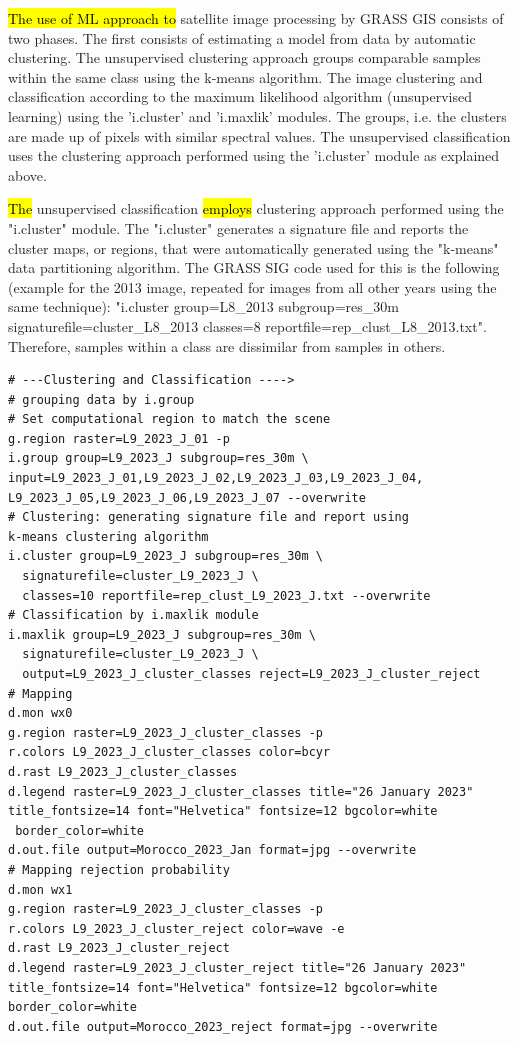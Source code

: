 \documentclass[geomatics,article,submit,pdftex,moreauthors]{Definitions/mdpi}
\begin{document}
\hl{The use of ML approach to} satellite image processing by GRASS GIS consists of two phases. The first consists of estimating a model from data by automatic clustering. The unsupervised clustering approach groups comparable samples within the same class using the k-means algorithm. The image clustering and classification according to the maximum likelihood algorithm (unsupervised learning) using the 'i.cluster' and 'i.maxlik' modules. The groups, i.e. the clusters are made up of pixels with similar spectral values. The unsupervised classification uses the clustering approach performed using the 'i.cluster' module as explained above.

\hl{The }unsupervised classification \hl{employs} clustering approach performed using the "i.cluster" module. The "i.cluster" generates a signature file and reports the cluster maps, or regions, that were automatically generated using the "k-means" data partitioning algorithm. The GRASS SIG code used for this is the following (example for the 2013 image, repeated for images from all other years using the same technique): "i.cluster group=L8\_2013 subgroup=res\_30m signaturefile=cluster\_L8\_2013 classes=8 reportfile=rep\_clust\_L8\_2013.txt". Therefore, samples within a class are dissimilar from samples in others.

\begin{footnotesize}
\begin{verbatim}
# ---Clustering and Classification ---->
# grouping data by i.group
# Set computational region to match the scene
g.region raster=L9_2023_J_01 -p
i.group group=L9_2023_J subgroup=res_30m \
input=L9_2023_J_01,L9_2023_J_02,L9_2023_J_03,L9_2023_J_04,
L9_2023_J_05,L9_2023_J_06,L9_2023_J_07 --overwrite
# Clustering: generating signature file and report using 
k-means clustering algorithm
i.cluster group=L9_2023_J subgroup=res_30m \
  signaturefile=cluster_L9_2023_J \
  classes=10 reportfile=rep_clust_L9_2023_J.txt --overwrite
# Classification by i.maxlik module
i.maxlik group=L9_2023_J subgroup=res_30m \
  signaturefile=cluster_L9_2023_J \
  output=L9_2023_J_cluster_classes reject=L9_2023_J_cluster_reject 
# Mapping
d.mon wx0
g.region raster=L9_2023_J_cluster_classes -p
r.colors L9_2023_J_cluster_classes color=bcyr
d.rast L9_2023_J_cluster_classes
d.legend raster=L9_2023_J_cluster_classes title="26 January 2023" 
title_fontsize=14 font="Helvetica" fontsize=12 bgcolor=white
 border_color=white
d.out.file output=Morocco_2023_Jan format=jpg --overwrite
# Mapping rejection probability
d.mon wx1
g.region raster=L9_2023_J_cluster_classes -p
r.colors L9_2023_J_cluster_reject color=wave -e
d.rast L9_2023_J_cluster_reject
d.legend raster=L9_2023_J_cluster_reject title="26 January 2023" 
title_fontsize=14 font="Helvetica" fontsize=12 bgcolor=white 
border_color=white
d.out.file output=Morocco_2023_reject format=jpg --overwrite
\end{verbatim}
\end{footnotesize}
\end{document}
